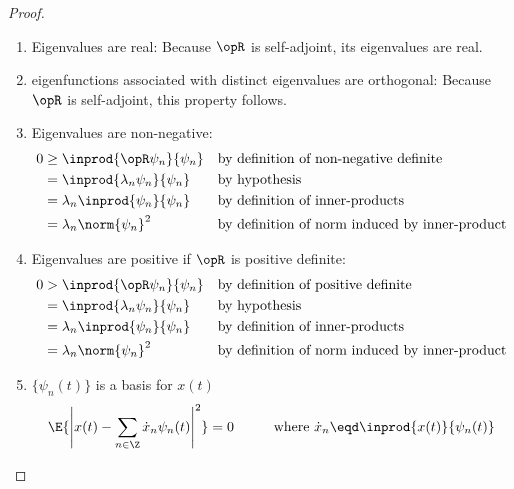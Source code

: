 \begin{proof}
\begin{enumerate}
\item Eigenvalues are real:
Because $\opR$ is self-adjoint, its eigenvalues are real.

\item eigenfunctions associated with distinct eigenvalues are orthogonal:
Because $\opR$ is self-adjoint, this property follows.

\item Eigenvalues are non-negative:
\begin{align*}
   0 &\ge \inprod{\opR \psi_n}{\psi_n}
     &&   \text{by definition of non-negative definite}
   \\&=   \inprod{\lambda_n \psi_n}{\psi_n}
     &&   \text{by hypothesis}
   \\&=   \lambda_n \inprod{\psi_n}{\psi_n}
     &&   \text{by definition of inner-products}
   \\&=   \lambda_n \norm{\psi_n}^2
     &&   \text{by definition of norm induced by inner-product}
\end{align*}

\item Eigenvalues are positive if $\opR$ is positive definite:
\begin{align*}
   0 &> \inprod{\opR \psi_n}{\psi_n}
     && \text{by definition of positive definite}
   \\&= \inprod{\lambda_n \psi_n}{\psi_n}
     && \text{by hypothesis}
   \\&= \lambda_n \inprod{\psi_n}{\psi_n}
     && \text{by definition of inner-products}
   \\&= \lambda_n \norm{\psi_n}^2
     && \text{by definition of norm induced by inner-product}
\end{align*}

\item $\{\psi_n(t)\}$ is a basis for $x(t)$
      \[ \E{\left| x(t)-\sum_{n\in\Z}\dot{x}_n \psi_n(t) \right|^2} = 0
         \hspace{1cm}\mbox{where } \dot{x}_n\eqd \inprod{x(t)}{\psi_n(t)}
      \]


\end{enumerate}
\end{proof}
